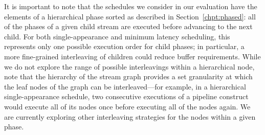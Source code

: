 It is important to note that the schedules we consider in our
evaluation have the elements of a hierarchical phase sorted as
described in Section~\ref{chpt:phased}: all of the phases of a given
child stream are executed before advancing to the next child.  For
both single-appearance and minimum latency scheduling, this represents
only one possible execution order for child phases; in particular, a
more fine-grained interleaving of children could reduce buffer
requirements.  While we do not explore the range of possible
interleavings within a hierarchical node, note that the hierarchy of
the stream graph provides a set granularity at which the leaf nodes of
the graph can be interleaved---for example, in a hierarchical
single-appearance schedule, two consecutive executions of a pipeline
construct would execute all of its nodes once before executing all of
the nodes again.  We are currently exploring other interleaving
strategies for the nodes within a given phase.
